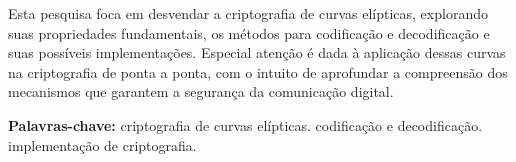 Esta pesquisa foca em desvendar a criptografia de curvas elípticas, explorando
suas propriedades fundamentais, os métodos para codificação e decodificação e
suas possíveis implementações. Especial atenção é dada à aplicação dessas
curvas na criptografia de ponta a ponta, com o intuito de aprofundar a
compreensão dos mecanismos que garantem a segurança da comunicação digital.

\textbf{Palavras-chave: }{criptografia de curvas elípticas. codificação e decodificação. implementação de criptografia.}
